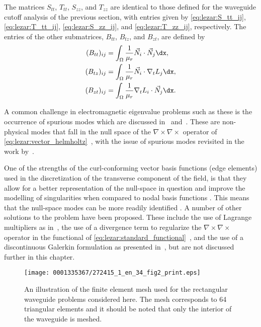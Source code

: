 The matrices $S_{tt}$, $T_{tt}$, $S_{zz}$, and $T_{zz}$ are identical to
those defined for the waveguide cutoff analysis of the previous section,
with entries given by \eqref{eq:lezar:S_tt_ij}, \eqref{eq:lezar:T_tt_ij},
\eqref{eq:lezar:S_zz_ij}, and \eqref{eq:lezar:T_zz_ij}, respectively. The
entries of the other submatrices, $B_{tt}$, $B_{tz}$, and $B_{zt}$,
are defined by
\begin{align}
\label{eq:lezar:B_tt_ij}
(B_{tt})_{ij} &=
\int_\Omega \frac{1}{\mu_r}\vec{N}_i\cdot\vec{N}_j \dx,\\
\label{eq:lezar:B_tz_ij}
(B_{tz})_{ij} &=
\int_\Omega \frac{1}{\mu_r}\vec{N}_i\cdot\nabla_t{L_j} \dx,\\
\label{eq:lezar:B_zt_ij}
(B_{zt})_{ij} &=
\int_\Omega \frac{1}{\mu_r}\nabla_t{L_i}\cdot\vec{N}_j \dx.
\end{align}

A common challenge in electromagnetic eigenvalue problems such as these is
the occurrence of spurious modes which are discussed in~\citet{Jin2002}
and~\citet{Davidson2011}. These are non-physical
modes that fall in the null space of the $\nabla\times{\nabla\times}$
operator of \eqref{eq:lezar:vector_helmholtz}~\citep{Bossavit1998},
with the issue of spurious modes revisited in the work
by~\citet{FernandesRaffetto2002}.

One of the strengths of the curl-conforming vector basis functions
(edge elements) used in the discretization of the transverse component
of the field, is that they allow for a better representation of the
null-space in question and improve the modelling of singularities when
compared to nodal basis functions \citep{Webb1993}. This means that the
null-space modes can be more readily identified \citep{Davidson2011,
Jin2002}. A number of other solutions to the problem have
been proposed. These include the use of Lagrange multipliers as
in~\citet{VardapetyanDemkowicz2002}, the use of a divergence term to
regularize the $\nabla\times{\nabla\times}$ operator in the functional
of \eqref{eq:lezar:standard_functional}~\citep{ConstableDauge2002},
and the use of a discontinuous Galerkin formulation as presented
in~\citet{BuffaHoustonPerugia2007}, but are not discussed further in
this chapter.

\begin{figure}[!b]
\centering
\texttt{[image: 0001335367/272415\_1\_en\_34\_fig2\_print.eps]}
\caption{An illustration of the finite element mesh used for the
rectangular waveguide problems considered here. The mesh corresponds
to 64 triangular elements and it should be noted that only the interior
of the waveguide is meshed.}\label{fig:lezar:rectangular_fenics_mesh}\vspace*{-4pt}
\end{figure}


